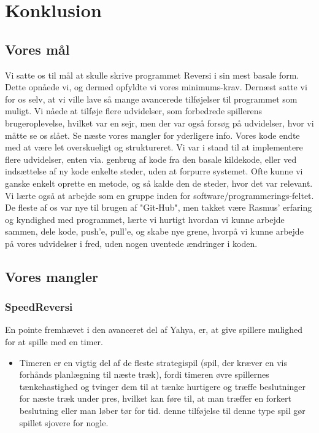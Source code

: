 \section{Konklusion}

\subsection{Vores mål}\label{VM}
Vi satte os til mål at skulle skrive programmet Reversi i sin mest basale form. Dette opnåede vi, og dermed opfyldte vi vores minimums-krav. Dernæst satte vi for os selv, at vi ville lave så mange avancerede tilføjelser til programmet som muligt. Vi nåede at tilføje flere udvidelser, som forbedrede spillerens brugeroplevelse, hvilket var en sejr, men der var også forsøg på udvidelser, hvor vi måtte se os slået. Se næste {vores mangler} for yderligere info. 
Vores kode endte med at være let overskueligt og struktureret. Vi var i stand til at implementere flere udvidelser, enten via. genbrug af kode fra den basale kildekode, eller ved indsættelse af ny kode enkelte steder, uden at forpurre systemet. Ofte kunne vi ganske enkelt oprette en metode, og så kalde den de steder, hvor det var relevant. 
Vi lærte også at arbejde som en gruppe inden for software/programmerings-feltet. De fleste af os var nye til brugen af "Git-Hub", men takket være Rasmus' erfaring og kyndighed med programmet, lærte vi hurtigt hvordan vi kunne arbejde sammen, dele kode, push'e, pull'e, og skabe nye grene, hvorpå vi kunne arbejde på vores udvidelser i fred, uden nogen uventede ændringer i koden. 


\subsection{Vores mangler}
\subsubsection{SpeedReversi}
En pointe fremhævet i den avanceret del af Yahya, er, at give spillere mulighed for at spille med en timer.
\begin{itemize}
\item Timeren er en vigtig del af de fleste strategispil (spil, der kræver en vis forhånds planlægning til næste træk), fordi timeren øvre spillernes tænkehastighed og tvinger dem til at tænke hurtigere og træffe beslutninger for næste træk under pres, hvilket kan føre til, at man træffer en forkert beslutning eller man løber tør for tid. denne tilføjelse til denne type spil gør spillet sjovere for nogle. 
\end{itemize}

